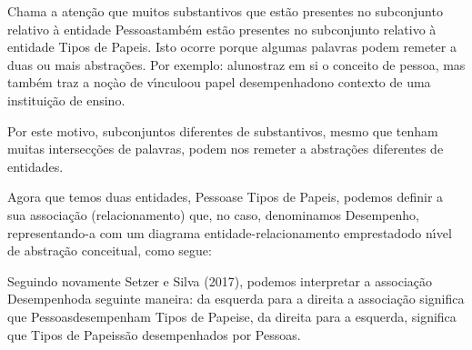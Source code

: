 \documentclass[
12pt,		%
openright,	%
twoside,  %
a4paper,			%
chapter=TITLE,		%
english,			%
french,				%
spanish,			%
brazil				%
]{USPSC-classe/USPSC}
\begin{document}
Chama a aten\c{c}\~ao que muitos substantivos que est\~ao presentes no subconjunto relativo \`a entidade \textquotedbl Pessoas\textquotedbl  tamb\'em est\~ao presentes no subconjunto relativo \`a entidade \textquotedbl Tipos de Papeis\textquotedbl . Isto ocorre porque algumas palavras podem remeter a duas ou mais abstra\c{c}\~oes. Por exemplo: \textquotedbl alunos\textquotedbl  traz em si o conceito de \textquotedbl pessoa\textquotedbl , mas tamb\'em traz a no\c{c}\`ao de \textquotedbl v\'{\i}nculo\textquotedbl  ou \textquotedbl papel desempenhado\textquotedbl  no contexto de uma institui\c{c}\~ao de ensino.









Por este motivo, subconjuntos diferentes de substantivos, mesmo que tenham muitas intersec\c{c}\~oes de palavras, podem nos remeter a abstra\c{c}\~oes diferentes de entidades.









Agora que temos duas entidades, \textquotedbl Pessoas\textquotedbl  e \textquotedbl Tipos de Papeis\textquotedbl , podemos definir a sua associa\c{c}\~ao (relacionamento) que, no caso, denominamos \textquotedbl Desempenho\textquotedbl , representando-a com um diagrama entidade-relacionamento \textquotedbl emprestado\textquotedbl  do n\'{\i}vel de abstra\c{c}\~ao conceitual, como segue:











Seguindo novamente  Setzer e Silva (2017), podemos interpretar a associa\c{c}\~ao \textquotedbl Desempenho\textquotedbl  da seguinte maneira: da esquerda para a direita a associa\c{c}\~ao significa que \textquotedbl Pessoas\textquotedbl  desempenham \textquotedbl Tipos de Papeis\textquotedbl  e, da direita para a esquerda, significa que \textquotedbl Tipos de Papeis\textquotedbl  s\~ao desempenhados por \textquotedbl Pessoas\textquotedbl .
\end{document}
